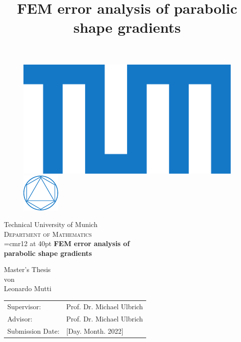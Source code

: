 \documentclass[english,a4paper,9pt,oneside]{scrbook}	%
\theoremstyle{break}
\theoremstyle{remark}
\begin{document}
\pagestyle{empty}       %

\vspace*{3cm}
\begin{figure}[H]
\centering
\includegraphics[height=0.075\columnwidth]{Logos/blau/2015_Logo_TUM_CMYK.pdf}
\hspace{90pt}
\includegraphics[height=0.075\columnwidth]{Logos/08_Mathematik/MA_blau/FAK_MA_CMYK.pdf}
\end{figure}
\vspace*{1.5cm}
\begin{center}
{\Huge Technical University of Munich}
\\
\vspace*{1.5cm}
{\huge \textsc{Department of Mathematics}}
\\
\vspace*{3cm}
\font\myfont=cmr12 at 40pt
{\Huge \textbf{FEM error analysis of\\parabolic shape gradients\\}}
\title{FEM error analysis of parabolic shape gradients}
\vspace*{3cm}
{\Large Master's Thesis}\linebreak \\
{\Large von}\linebreak \\
{\Large Leonardo Mutti}\\
\vspace*{3cm}
{\Large 
\begin{tabular}{ll}
Supervisor: & Prof. Dr. Michael Ulbrich\\
Advisor: & Prof. Dr. Michael Ulbrich\\
Submission Date: & [Day. Month. 2022]
\end{tabular}
}
\end{center}

\newpage    %
\pagestyle{plain}
\end{document}
